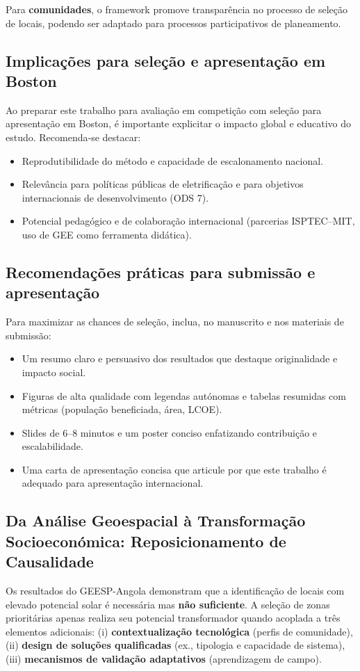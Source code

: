 \documentclass[12pt, a4paper]{article}
\begin{document}
Para \textbf{comunidades}, o framework promove transparência no processo de seleção de locais, podendo ser adaptado para processos participativos de planeamento.

\subsection{Implicações para seleção e apresentação em Boston}
Ao preparar este trabalho para avaliação em competição com seleção para apresentação em Boston, é importante explicitar o impacto global e educativo do estudo. Recomenda‑se destacar:
\begin{itemize}
    \item Reprodutibilidade do método e capacidade de escalonamento nacional.
    \item Relevância para políticas públicas de eletrificação e para objetivos internacionais de desenvolvimento (ODS 7).
    \item Potencial pedagógico e de colaboração internacional (parcerias ISPTEC–MIT, uso de GEE como ferramenta didática).
\end{itemize}

\subsection{Recomendações práticas para submissão e apresentação}
Para maximizar as chances de seleção, inclua, no manuscrito e nos materiais de submissão:
\begin{itemize}
    \item Um resumo claro e persuasivo dos resultados que destaque originalidade e impacto social.
    \item Figuras de alta qualidade com legendas autónomas e tabelas resumidas com métricas (população beneficiada, área, LCOE).
    \item Slides de 6–8 minutos e um poster conciso enfatizando contribuição e escalabilidade.
    \item Uma carta de apresentação concisa que articule por que este trabalho é adequado para apresentação internacional.
\end{itemize}

\subsection{Da Análise Geoespacial à Transformação Socioeconómica: Reposicionamento de Causalidade}

Os resultados do GEESP-Angola demonstram que a identificação de locais com elevado 
potencial solar é necessária mas \textbf{não suficiente}. A seleção de zonas prioritárias 
apenas realiza seu potencial transformador quando acoplada a três elementos adicionais: 
(i) \textbf{contextualização tecnológica} (perfis de comunidade), (ii) \textbf{design de 
soluções qualificadas} (ex., tipologia e capacidade de sistema), (iii) \textbf{mecanismos 
de validação adaptativos} (aprendizagem de campo).
\end{document}
